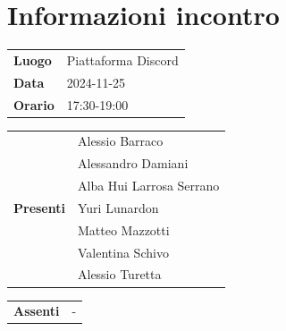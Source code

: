 \section{Informazioni incontro}
\vspace{0.25cm}
\begin{tabular}{p{1.75cm} | l}
    \textbf{Luogo} & Piattaforma Discord\\
    \textbf{Data} & 2024-11-25\\
    \textbf{Orario} & 17:30-19:00\\
\end{tabular}

\vspace{0.5cm}
\noindent
\begin{tabular}{p{1.75cm} | l}
    \multirow{7}{*}{\textbf{Presenti}}
        & Alessio Barraco\\
        & Alessandro Damiani\\ %
        & Alba Hui Larrosa Serrano\\
        & Yuri Lunardon\\
        & Matteo Mazzotti\\
        & Valentina Schivo\\
        & Alessio Turetta
\end{tabular}

\vspace{0.5cm}
\noindent
\begin{tabular}{p{1.75cm} | l}
    \multirow{1}{*}{\textbf{Assenti}}
        & -\\
\end{tabular}